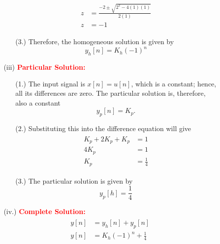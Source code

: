 \documentclass[a4paper, 12pt]{article}
\begin{document}
\begin{itemize}
\begin{itemize}
\begin{itemize}
\begin{itemize}
\begin{equation}
\begin{gathered}
\begin{alignedat}{1}
z &= \frac{-2 \pm \sqrt{2^{2} - 4(1)(1)}}{2(1)} \\
z &= -1 
\end{alignedat}
\end{gathered}
\end{equation}
\item[(3.)]{Therefore, the homogeneous solution is given by}
\begin{equation}
\boxed{y_{h}[n] = K_{h}(-1)^{n}}
\end{equation}
\end{itemize}
\item[(iii)]{\textcolor{red}{\textbf{Particular Solution:}}}
\begin{itemize}
\item[(1.)]{The input signal is $x[n] = u[n]$, which is a constant; hence, all its differences are zero. The particular solution is, therefore, also a constant}
\begin{equation}
y_{p}[n] = K_{p}.
\end{equation}
\item[(2.)]{Substituting this into the difference equation will give}
\begin{equation}
\begin{gathered}
\begin{alignedat}{1}
K_{p} + 2 K_{p} + K_{p} & = 1 \\
4K_{p} &= 1 \\
K_{p} & = \frac{1}{4}
\end{alignedat}
\end{gathered}
\end{equation}
\item[(3.)]{The particular solution is given by}
\begin{equation}
\boxed{y_{p}[h] = \frac{1}{4}}
\end{equation}
\end{itemize}
\item[(iv.)]{\textcolor{red}{\textbf{Complete Solution:}}}
\begin{equation}
\begin{gathered}
\begin{alignedat}{1}
y[n] &= y_{h}[n] + y_{p}[n] \\
y[n] &= K_{h}(-1)^{n} + \frac{1}{4}
\end{alignedat}
\end{gathered}

\end{equation}
\end{itemize}
\end{itemize}
\end{itemize}
\end{document}

